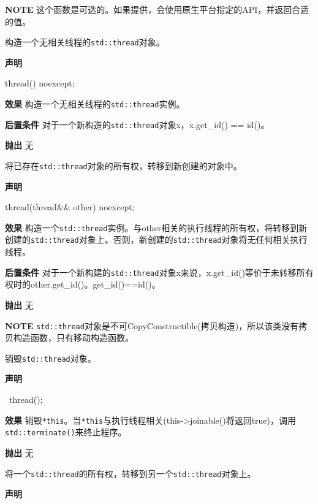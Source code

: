 \textbf{NOTE} 这个函数是可选的。如果提供，会使用原生平台指定的API，并返回合适的值。


构造一个无相关线程的\texttt{std::thread}对象。

\textbf{声明}

\begin{cpp}
thread() noexcept;
\end{cpp}

\textbf{效果}
构造一个无相关线程的\texttt{std::thread}实例。

\textbf{后置条件}
对于一个新构造的\texttt{std::thread}对象x，x.get\_id() == id()。

\textbf{抛出}
无


将已存在\texttt{std::thread}对象的所有权，转移到新创建的对象中。

\textbf{声明}

\begin{cpp}
thread(thread&& other) noexcept;
\end{cpp}

\textbf{效果}
构造一个\texttt{std::thread}实例。与other相关的执行线程的所有权，将转移到新创建的\texttt{std::thread}对象上。否则，新创建的\texttt{std::thread}对象将无任何相关执行线程。

\textbf{后置条件}
对于一个新构建的\texttt{std::thread}对象x来说，x.get\_id()等价于未转移所有权时的other.get\_id()。get\_id()==id()。

\textbf{抛出}
无

\textbf{NOTE} \texttt{std::thread}对象是不可CopyConstructible(拷贝构造)，所以该类没有拷贝构造函数，只有移动构造函数。


销毁\texttt{std::thread}对象。

\textbf{声明}

\begin{cpp}
~thread();
\end{cpp}

\textbf{效果}
销毁\texttt{*this}。当\texttt{*this}与执行线程相关(this->joinable()将返回true)，调用\texttt{std::terminate()}来终止程序。

\textbf{抛出}
无


将一个\texttt{std::thread}的所有权，转移到另一个\texttt{std::thread}对象上。

\textbf{声明}

